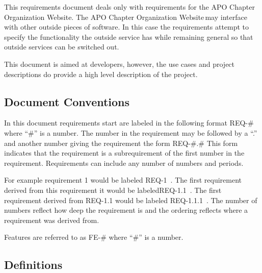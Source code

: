 \documentclass{article}
\newcommand{\projName}{APO Chapter Organization Website}
\newcommand{\req}[1]{REQ-{#1}}
\begin{document}
This requirements document deals only with requirements for the \projName. The \projName \,may interface with
other outside pieces of software. In this case the requirements attempt to specify the functionality the outside service has
while remaining general so that outside services can be switched out.

This document is aimed at developers, however, the use cases and project descriptions do provide a high level
description of the project.

\subsection{Document Conventions}

In this document requirements start are labeled in the following
format REQ-\#  where ``\#'' is a number.
The number in the requirement may be followed by a ``.'' and 
another number giving the requirement the form
REQ-\#.\#  This form indicates that the requirement is a
subrequirement of the first number in the requirement. 
Requirements can include any number of numbers and periods.

For example requirement 1 would be labeled \req{1} \,. The first
requirement derived from this requirement it would be labeled\req{1.1}
\,. The first requirement derived from \req{1.1} would be labeled
\req{1.1.1} \,. The number of numbers reflect how deep the requirement
is and the ordering reflects where a requirement was derived from.

Features are referred to as FE-\# where ``\#'' is a number.

\subsection{Definitions}
\end{document}
